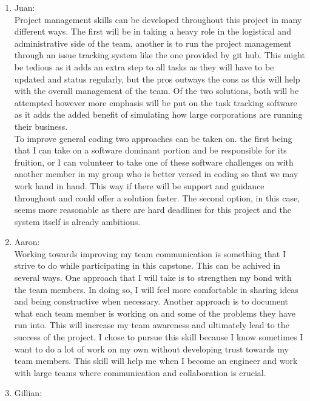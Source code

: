 \documentclass[12pt, titlepage]{article}
\begin{document}
\begin{enumerate}
\begin{enumerate}
    \item{Juan:}\\
        Project management skills can be developed throughout this project in many different ways.
        The first will be in taking a heavy role in the logistical and administrative side of the 
        team, another is to run the project management through an issue tracking system
        like the one provided by git hub. This might be tedious as it adds an extra step to all tasks as they will have to be
        updated and status regularly, but the pros outways the cons as this will help with the overall
        management of the team. Of the two solutions, both will be attempted however more emphasis will 
        be put on the task tracking software as it adds the added benefit of simulating how large
        corporations are running their business.\\
        To improve general coding two approaches can be taken on. the first being 
        that I can take on a software dominant portion and be responsible for its fruition, or I can volunteer
        to take one of these software challenges on with another member in my group who is better versed in
        coding so that we may work hand in hand. This way if there will be support and guidance throughout 
        and could offer a solution faster. The second option, in this case, seems more reasonable as there are
        hard deadlines for this project and the system itself is already ambitious.\\
    \item{Aaron:}\\
    Working towards improving my team communication is something that I strive to do while participating
    in this capstone. This can be achived in several ways. One approach that I will take is 
    to strengthen my bond with the team members. In doing so, I will feel more comfortable in sharing ideas and 
    being constructive when necessary. Another approach is to document what each team member is working on and some of the problems they have run into.
    This will increase my team awareness and ultimately lead to the success of the project. I chose to pursue this skill
    because I know sometimes I want to do a lot of work on my own without developing trust towards my team members. This skill
    will help me when I become an engineer and work with large teams where communication and collaboration is crucial.\\
    \item {Gillian:}\\

\end{enumerate}
\end{enumerate}
\end{document}
